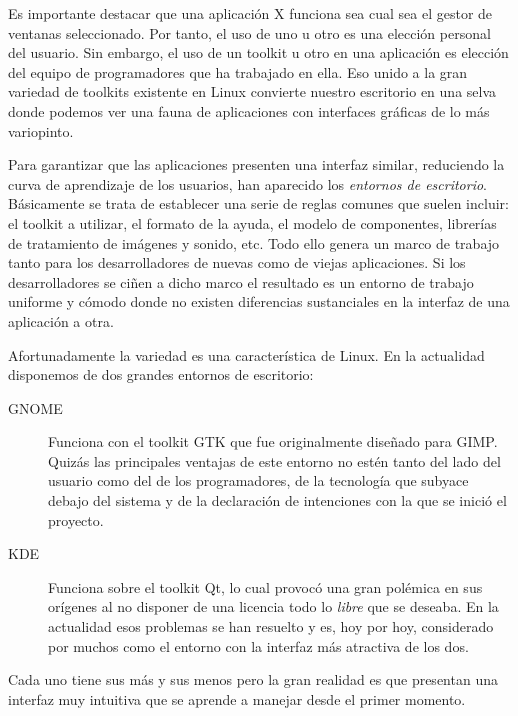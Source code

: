 Es importante  destacar que una  aplicación {\sf X} funciona  sea cual
sea el  gestor de ventanas  seleccionado. Por tanto,  el uso de  uno u
otro es  una elección  personal del  usuario. Sin  embargo, el  uso de
un  toolkit  u otro  en  una  aplicación  es  elección del  equipo  de
programadores que ha  trabajado en ella. Eso unido a  la gran variedad
de toolkits  existente en  Linux convierte  nuestro escritorio  en una
selva  donde podemos  ver  una fauna  de  aplicaciones con  interfaces
gráficas de lo más variopinto.

Para garantizar  que las aplicaciones presenten  una interfaz similar,
reduciendo la curva de aprendizaje  de los usuarios, han aparecido los
{\em entornos de  escritorio}. Básicamente se trata  de establecer una
serie de  reglas comunes  que suelen incluir:  el toolkit  a utilizar,
el  formato  de la  ayuda,  el  modelo  de componentes,  librerías  de
tratamiento de  imágenes y sonido, etc.  Todo ello genera un  marco de
trabajo  tanto  para los  desarrolladores  de  nuevas como  de  viejas
aplicaciones.  Si  los  desarrolladores  se ciñen  a  dicho  marco  el
resultado es un entorno de trabajo  uniforme y cómodo donde no existen
diferencias sustanciales en la interfaz de una aplicación a otra.

Afortunadamente  la variedad  es una  característica de  Linux. En  la
actualidad disponemos de dos grandes entornos de escritorio:

\begin{description}

\item[GNOME] Funciona con el toolkit {\sf GTK}
que fue originalmente diseñado para {\sf GIMP}. Quizás las principales
ventajas de este entorno no estén  tanto del lado del usuario como del
de los programadores, de la  tecnología que subyace debajo del sistema
y de la declaración de intenciones con la que se inició el proyecto.

\item[KDE] Funciona sobre el toolkit {\sf Qt}, lo
cual provocó una  gran polémica en sus orígenes al  no disponer de una
licencia todo  lo {\em libre}  que se  deseaba. En la  actualidad esos
problemas se  han resuelto y es,  hoy por hoy, considerado  por muchos
como el entorno con la interfaz más atractiva de los dos.

\end{description}

Cada  uno tiene  sus más  y sus  menos pero  la gran  realidad es  que
presentan una interfaz muy intuitiva que se aprende a manejar desde el
primer momento.

